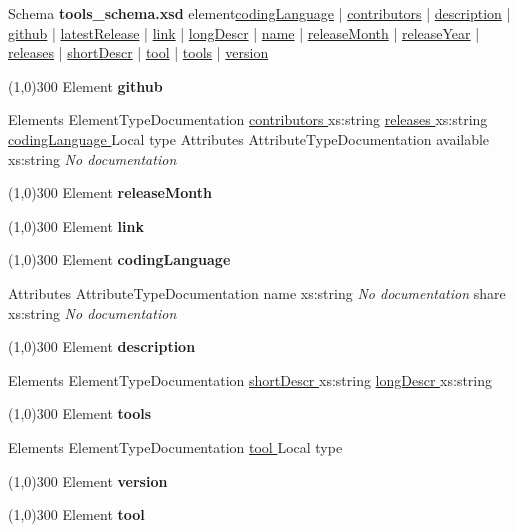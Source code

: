 \thispagestyle{empty}
{


Schema \textbf{tools\_schema.xsd
 }
 element\hyperlink{element_codingLanguage}{codingLanguage} | \hyperlink{element_contributors}{contributors} | \hyperlink{element_description}{description} | \hyperlink{element_github}{github} | \hyperlink{element_latestRelease}{latestRelease} | \hyperlink{element_link}{link} | \hyperlink{element_longDescr}{longDescr} | \hyperlink{element_name}{name} | \hyperlink{element_releaseMonth}{releaseMonth} | \hyperlink{element_releaseYear}{releaseYear} | \hyperlink{element_releases}{releases} | \hyperlink{element_shortDescr}{shortDescr} | \hyperlink{element_tool}{tool} | \hyperlink{element_tools}{tools} | \hyperlink{element_version}{version}

\line(1,0){300}
\hypertarget{element_github}{}
 Element
 \textbf{
 github
 }
 
 Elements
 ElementTypeDocumentation
 \hyperlink{element_contributors}{
 contributors
 }
 xs:string
 \textit{}
 \hyperlink{element_releases}{
 releases
 }
 xs:string
 \textit{}
 \hyperlink{element_codingLanguage}{
 codingLanguage
 }
 Local type
 \textit{}
 Attributes
 AttributeTypeDocumentation
 available
 xs:string
 \textit{
 No documentation
 }

\line(1,0){300}
\hypertarget{element_releaseMonth}{}
 Element
 \textbf{
 releaseMonth
 }

\line(1,0){300}
\hypertarget{element_link}{}
 Element
 \textbf{
 link
 }

\line(1,0){300}
\hypertarget{element_codingLanguage}{}
 Element
 \textbf{
 codingLanguage
 }
 
 Attributes
 AttributeTypeDocumentation
 name
 xs:string
 \textit{
 No documentation
 }
 share
 xs:string
 \textit{
 No documentation
 }

\line(1,0){300}
\hypertarget{element_description}{}
 Element
 \textbf{
 description
 }
 
 Elements
 ElementTypeDocumentation
 \hyperlink{element_shortDescr}{
 shortDescr
 }
 xs:string
 \textit{}
 \hyperlink{element_longDescr}{
 longDescr
 }
 xs:string
 \textit{}

\line(1,0){300}
\hypertarget{element_tools}{}
 Element
 \textbf{
 tools
 }
 
 Elements
 ElementTypeDocumentation
 \hyperlink{element_tool}{
 tool
 }
 Local type
 \textit{}

\line(1,0){300}
\hypertarget{element_version}{}
 Element
 \textbf{
 version
 }

\line(1,0){300}
\hypertarget{element_tool}{}
 Element
 \textbf{
 tool
 }
 
}
